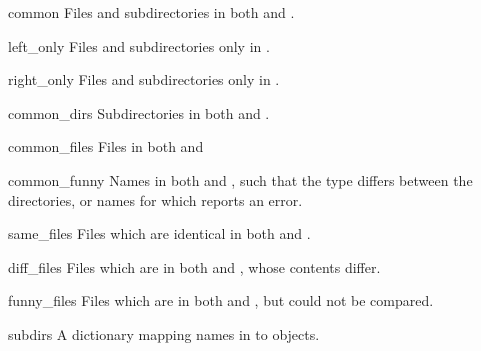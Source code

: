 \begin{memberdesc}[dircmp]{common}
Files and subdirectories in both  and .
\end{memberdesc}

\begin{memberdesc}[dircmp]{left_only}
Files and subdirectories only in .
\end{memberdesc}

\begin{memberdesc}[dircmp]{right_only}
Files and subdirectories only in .
\end{memberdesc}

\begin{memberdesc}[dircmp]{common_dirs}
Subdirectories in both  and .
\end{memberdesc}

\begin{memberdesc}[dircmp]{common_files}
Files in both  and 
\end{memberdesc}

\begin{memberdesc}[dircmp]{common_funny}
Names in both  and , such that the type differs between
the directories, or names for which  reports an
error.
\end{memberdesc}

\begin{memberdesc}[dircmp]{same_files}
Files which are identical in both  and .
\end{memberdesc}

\begin{memberdesc}[dircmp]{diff_files}
Files which are in both  and , whose contents differ.
\end{memberdesc}

\begin{memberdesc}[dircmp]{funny_files}
Files which are in both  and , but could not be
compared.
\end{memberdesc}

\begin{memberdesc}[dircmp]{subdirs}
A dictionary mapping names in  to
 objects.
\end{memberdesc}
